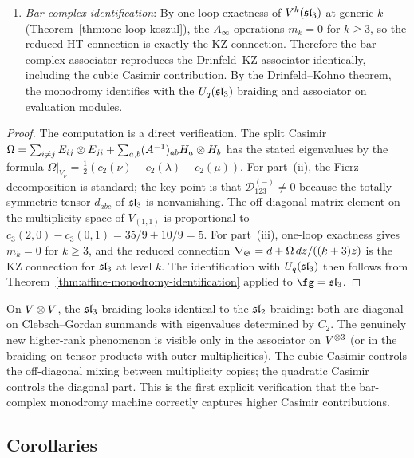\begin{proposition}
\begin{enumerate}[label=\textup{(\roman*)}]
 \item \emph{Bar-complex identification}: By one-loop exactness of $V^k(\mathfrak{sl}_3)$ at generic $k$ \textup{(}Theorem~\textup{\ref{thm:one-loop-koszul})}, the $A_\infty$ operations $m_k = 0$ for $k \geq 3$, so the reduced HT connection is exactly the KZ connection. Therefore the bar-complex associator reproduces the Drinfeld--KZ associator identically, including the cubic Casimir contribution. By the Drinfeld--Kohno theorem, the monodromy identifies with the $U_q(\mathfrak{sl}_3)$ braiding and associator on evaluation modules.
\end{enumerate}
\end{proposition}

\begin{proof}
The computation is a direct verification. The split Casimir $\Omega = \sum_{i \neq j} E_{ij} \otimes E_{ji} + \sum_{a,b} (A^{-1})_{ab} H_a \otimes H_b$ has the stated eigenvalues by the formula $\Omega|_{V_\nu} = \frac{1}{2}(c_2(\nu) - c_2(\lambda) - c_2(\mu))$. For part~(ii), the Fierz decomposition is standard; the key point is that $\mathcal{D}_{123}^{(-)} \neq 0$ because the totally symmetric tensor $d_{abc}$ of $\mathfrak{sl}_3$ is nonvanishing. The off-diagonal matrix element on the multiplicity space of $V_{(1,1)}$ is proportional to $c_3(2,0) - c_3(0,1) = 35/9 + 10/9 = 5$. For part~(iii), one-loop exactness gives $m_k = 0$ for $k \geq 3$, and the reduced connection $\nabla_{\mathfrak{S}} = d + \Omega\,dz/((k+3)z)$ is the KZ connection for $\mathfrak{sl}_3$ at level $k$. The identification with $U_q(\mathfrak{sl}_3)$ then follows from Theorem~\ref{thm:affine-monodromy-identification} applied to $\fg = \fsl_3$.
\end{proof}

\begin{remark}
\label{rem:cubic-through-associator}
On $V \otimes V$, the $\mathfrak{sl}_3$ braiding looks identical to the $\mathfrak{sl}_2$ braiding: both are diagonal on Clebsch--Gordan summands with eigenvalues determined by $C_2$. The genuinely new higher-rank phenomenon is visible only in the associator on $V^{\otimes 3}$ (or in the braiding on tensor products with outer multiplicities). The cubic Casimir controls the off-diagonal mixing between multiplicity copies; the quadratic Casimir controls the diagonal part. This is the first explicit verification that the bar-complex monodromy machine correctly captures higher Casimir contributions.
\end{remark}

\subsection{Corollaries}

